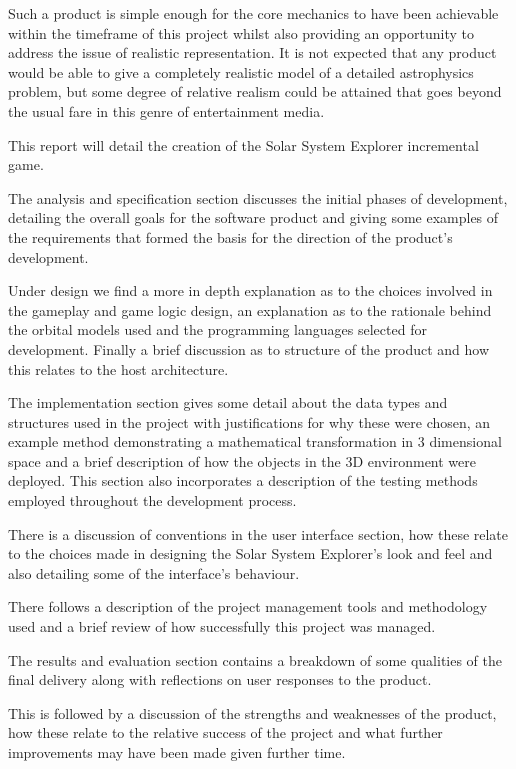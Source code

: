 \documentclass[twoside]{bhamthesis}
\begin{document}
Such a product is simple enough for the core mechanics to have been achievable within the timeframe of this project whilst also providing an opportunity to address the issue of realistic representation. It is not expected that any product would be able to give a completely realistic model of a detailed astrophysics problem, but some degree of relative realism could be attained that goes beyond the usual fare in this genre of entertainment media.

\bigskip
\noindent
This report will detail the creation of the Solar System Explorer incremental game.

The analysis and specification section discusses the initial phases of development, detailing the overall goals for the software product and giving some examples of the requirements that formed the basis for the direction of the product's development.

Under design we find a more in depth explanation as to the choices involved in the gameplay and game logic design, an explanation as to the rationale behind the orbital models used and the programming languages selected for development. Finally a brief discussion as to structure of the product and how this relates to the host architecture.

The implementation section gives some detail about the data types and structures used in the project with justifications for why these were chosen, an example method demonstrating a mathematical transformation in 3 dimensional space and a brief description of how the objects in the 3D environment were deployed. This section also incorporates a description of the testing methods employed throughout the development process.

There is a discussion of conventions in the user interface section, how these relate to the choices made in designing the Solar System Explorer's look and feel and also detailing some of the interface's behaviour.

There follows a description of the project management tools and methodology used and a brief review of how successfully this project was managed.

The results and evaluation section contains a breakdown of some qualities of the final delivery along with reflections on user responses to the product.

This is followed by a discussion of the strengths and weaknesses of the product, how these relate to the relative success of the project and what further improvements may have been made given further time.
\end{document}
